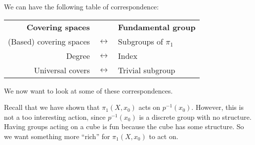 \documentclass[a4paper]{article}
\begin{document}
We can have the following table of correspondence:
\begin{center}
  \begin{tabular}{rcl}
    \textbf{Covering spaces} & & \textbf{Fundamental group}\\
    (Based) covering spaces & $\longleftrightarrow$ & Subgroups of $\pi_1$\\
    Degree & $\longleftrightarrow$ & Index\\
    Universal covers & $\longleftrightarrow$ & Trivial subgroup\\
  \end{tabular}
\end{center}
We now want to look at some of these correspondences.

Recall that we have shown that $\pi_1(X, x_0)$ acts on $p^{-1}(x_0)$. However, this is not a too interesting action, since $p^{-1}(x_0)$ is a discrete group with no structure. Having groups acting on a cube is fun because the cube has some structure. So we want something more ``rich'' for $\pi_1(X, x_0)$ to act on.
\end{document}
